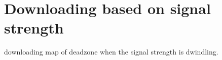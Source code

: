 \section{Downloading based on signal strength}
\label{sec:sigstr}

downloading map of deadzone when the signal strength is dwindling.
